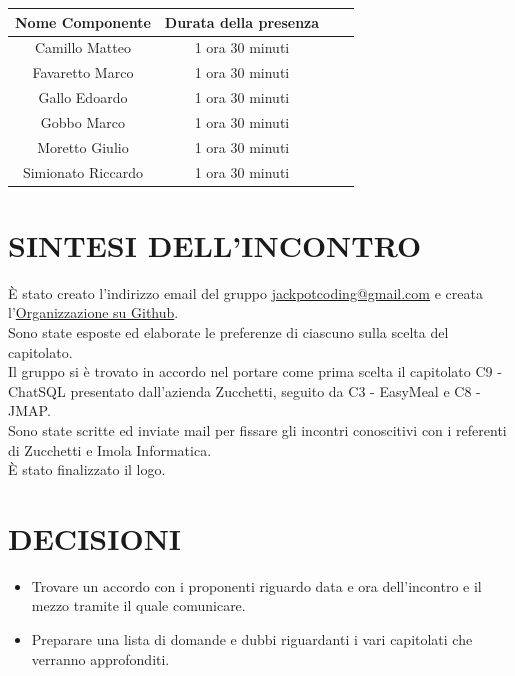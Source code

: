 \documentclass[5pt]{article}
\begin{document}
\begin{table}[ht]
  \begin{tabular}{|Sc|Sc|}
    \hline
    \textbf{Nome Componente} & \textbf{Durata della presenza} \\
    \hline
    Camillo Matteo & 1 ora 30 minuti \\
    Favaretto Marco & 1 ora 30 minuti \\
    Gallo Edoardo & 1 ora 30 minuti \\
    Gobbo Marco & 1 ora 30 minuti \\
    Moretto Giulio & 1 ora 30 minuti \\
    Simionato Riccardo & 1 ora 30 minuti \\
    \hline
  \end{tabular}
  \label{tab:conference}
\end{table}

\section{SINTESI DELL'INCONTRO}

È stato creato l’indirizzo email del gruppo \href{mailto:jackpotcoding@gmail.com}{jackpotcoding@gmail.com} e creata l'\href{https://github.com/Jackpot-Coding}{Organizzazione su Github}.\\
Sono state esposte ed elaborate le preferenze di ciascuno sulla scelta del capitolato. \\

\medskip
\noindent Il gruppo si è trovato in accordo nel portare come prima scelta il capitolato C9 - ChatSQL presentato dall’azienda Zucchetti, seguito da C3 - EasyMeal e C8 - JMAP.\\

\medskip
\noindent Sono state scritte ed inviate mail per fissare gli incontri conoscitivi con i referenti di Zucchetti e Imola Informatica.\\

\medskip
\noindent È stato finalizzato il logo.

\section{DECISIONI}
\begin{itemize}
    \item Trovare un accordo con i proponenti riguardo data e ora dell’incontro e il mezzo tramite il quale comunicare.
    \item Preparare una lista di domande e dubbi riguardanti i vari capitolati che verranno approfonditi. 
\end{itemize}
\end{document}
